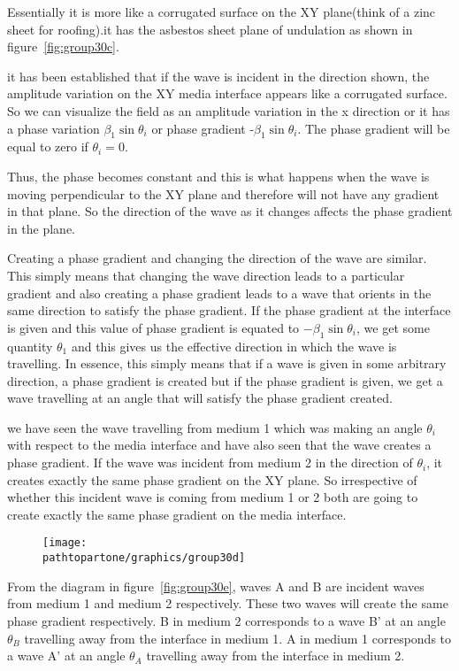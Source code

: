 Essentially it is more like a corrugated surface on the XY plane(think of a zinc sheet for roofing).it has the asbestos sheet plane of undulation as shown in figure~\ref{fig:group30c}.

it has been established that if the wave is incident in the direction shown, the amplitude variation on the XY media interface appears like a corrugated surface. So we can visualize the field as an amplitude variation in the x direction or it has a phase variation $\beta_1\sin \theta_i$ or phase gradient -$\beta_1\sin\theta_i$. The phase gradient will be equal to zero if $\theta_i=0$.

Thus, the phase becomes constant and this is what happens when the wave is moving perpendicular to the XY plane and therefore will not have any gradient in that plane. So the direction of the wave as it changes affects the phase gradient in the plane.

Creating a phase gradient and changing the direction of the wave are similar. This simply means that changing the wave direction leads to a particular gradient and also creating a phase gradient leads to a wave that orients in the same direction to satisfy the phase gradient. If the phase gradient at the interface is given and this value of phase gradient is equated to $-\beta_1 \sin \theta_i$, we get some quantity $\theta_1$ and this gives us the effective direction in which the wave is travelling. In essence, this simply means that if a wave is given in some arbitrary direction, a phase gradient is created but if the phase gradient is given, we get a wave travelling at an angle that will satisfy the phase gradient created.

we have seen the wave travelling from medium 1  which was making an angle $\theta_i$ with respect to the media interface and have also seen that the wave creates a phase gradient. If the wave was incident from medium 2 in the direction of $\theta_i$, it creates exactly the same phase gradient on the XY plane. So irrespective of whether this incident wave is coming from medium 1 or 2 both are going to create exactly the same phase gradient on the media interface.
\begin{figure}[h]
\centering
\texttt{[image: \\pathtopartone/graphics/group30d]}
\caption{}
\label{fig:group30d---copy}
\end{figure}

From the diagram in figure~\ref{fig:group30e}, waves A and B are incident waves from medium 1 and medium 2 respectively. These two waves will create the same phase gradient respectively. B in medium 2 corresponds to a wave B'  at an angle $\theta_B$ travelling away from the interface in medium 1. A in medium 1 corresponds to a wave A' at an angle $\theta_A$ travelling away from the interface in medium 2.

